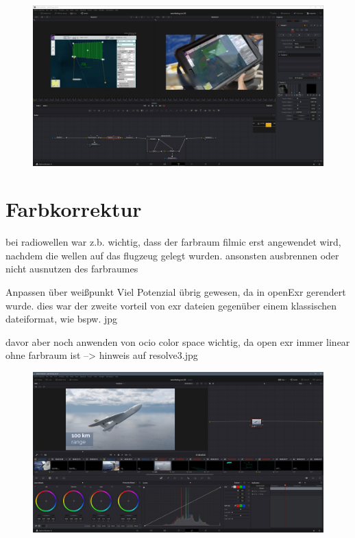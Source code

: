 \begin{figure}[H]
\begin{center}
\includegraphics[width=\textwidth]{gfx/post/resolve9.jpg}
\caption{}
\label{resolve9}
\end{center}
\end{figure}

\section{Farbkorrektur}


bei radiowellen war z.b. wichtig, dass der farbraum filmic erst angewendet wird, nachdem die wellen auf das flugzeug gelegt wurden. ansonsten ausbrennen oder nicht ausnutzen des farbraumes


Anpassen über weißpunkt
Viel Potenzial übrig gewesen, da in openExr gerendert wurde.
dies war der zweite vorteil von exr dateien gegenüber einem klassischen dateiformat, wie bspw. jpg

davor aber noch anwenden von ocio color space wichtig, da open exr immer linear ohne farbraum ist
--> hinweis auf resolve3.jpg



\begin{figure}[H]
\begin{center}
\includegraphics[width=\textwidth]{gfx/post/resolve7.jpg}
\caption{}
\label{resolve7}
\end{center}
\end{figure}

